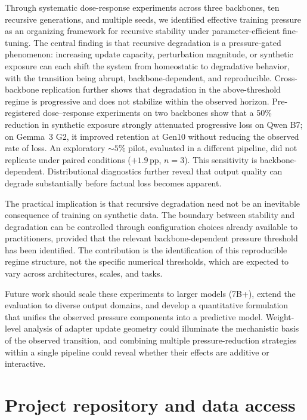 \documentclass[a4paper,fleqn]{cas-dc}
\newif\ifshowchanges
\newcommand{\rev}[1]{\ifshowchanges{\color{blue}#1}\else{#1}\fi}
\begin{document}
Through systematic dose-response experiments across three backbones, ten
recursive generations, and multiple seeds, we identified effective training
pressure as an organizing framework for recursive stability under
parameter-efficient fine-tuning. The central finding is that recursive
degradation is a pressure-gated phenomenon: increasing update capacity,
perturbation magnitude, or synthetic exposure \rev{can each shift} the system from homeostatic to degradative behavior, with the transition being
abrupt, backbone-dependent, and reproducible. Cross-backbone replication further
shows that degradation in the above-threshold regime is progressive and does not
stabilize within the observed horizon. \rev{Pre-registered dose--response
experiments on two backbones show that a 50\% reduction in synthetic exposure
strongly attenuated progressive loss on Qwen B7; on Gemma~3 G2, it improved
retention at Gen10 without reducing the observed rate of loss. An exploratory ${\sim}5\%$ pilot, evaluated in a
different pipeline, did not replicate under paired conditions ($+1.9$\,pp,
$n=3$).} This sensitivity is backbone-dependent. Distributional diagnostics further reveal
that output quality can degrade substantially before factual loss becomes
apparent.

The practical implication is that recursive degradation need not be an
inevitable consequence of training on synthetic data. The boundary between
stability and degradation can be controlled through configuration choices
already available to practitioners, provided that the relevant
backbone-dependent pressure threshold has been identified. The contribution is
the identification of this reproducible regime structure, not the specific
numerical thresholds, which are expected to vary across architectures, scales,
and tasks.

Future work should scale these experiments to larger models (7B+), extend the
evaluation to diverse output domains, and develop a quantitative formulation
that unifies the observed pressure components into a predictive model.
Weight-level analysis of adapter update geometry could illuminate the
mechanistic basis of the observed transition, and combining multiple
pressure-reduction strategies within a single pipeline could reveal whether
their effects are additive or interactive.


\appendix

\section{Project repository and data access}\label{app:repo}
\end{document}
